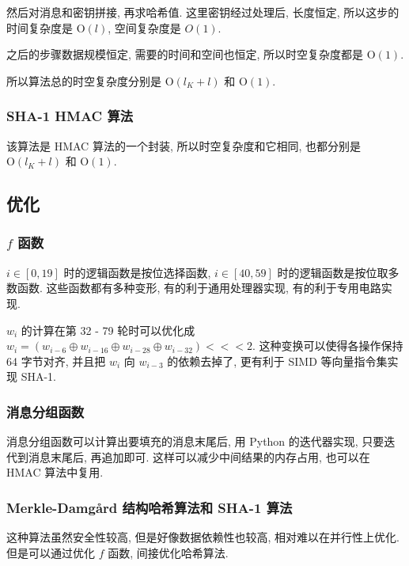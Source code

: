 \documentclass[12pt,a4paper]{article}
\begin{document}
然后对消息和密钥拼接, 再求哈希值. 这里密钥经过处理后, 长度恒定, 所以这步的时间复杂度是 $ \mathrm{O}(l) $, 空间复杂度是 $ O(1) $. 

之后的步骤数据规模恒定, 需要的时间和空间也恒定, 所以时空复杂度都是 $ \mathrm{O}(1) $. 

所以算法总的时空复杂度分别是 $ \mathrm{O}(l_K + l) $ 和 $ \mathrm{O}(1) $. 

\subsubsection*{SHA-1 HMAC 算法}

该算法是 HMAC 算法的一个封装, 所以时空复杂度和它相同, 也都分别是 $ \mathrm{O}(l_K + l) $ 和 $ \mathrm{O}(1) $. 

\subsection*{优化}

\subsubsection*{$ f $ 函数}

$ i \in [0, 19] $ 时的逻辑函数是按位选择函数, $ i \in [40, 59] $ 时的逻辑函数是按位取多数函数. 这些函数都有多种变形, 有的利于通用处理器实现, 有的利于专用电路实现. 

$ w_i $ 的计算在第 32 - 79 轮时可以优化成 $ w_i = (w_{i - 6} \oplus w_{i - 16} \oplus w_{i - 28} \oplus w_{i - 32}) <<< 2 $. 这种变换可以使得各操作保持 64 字节对齐, 并且把 $ w_i $ 向 $ w_{i - 3} $ 的依赖去掉了, 更有利于 SIMD 等向量指令集实现 SHA-1. 

\subsubsection*{消息分组函数}

消息分组函数可以计算出要填充的消息末尾后, 用 Python 的迭代器实现, 只要迭代到消息末尾后, 再追加即可. 这样可以减少中间结果的内存占用, 也可以在 HMAC 算法中复用. 

\subsubsection*{Merkle-Damgård 结构哈希算法和 SHA-1 算法}

这种算法虽然安全性较高, 但是好像数据依赖性也较高, 相对难以在并行性上优化. 但是可以通过优化 $ f $ 函数, 间接优化哈希算法. 
\end{document}
